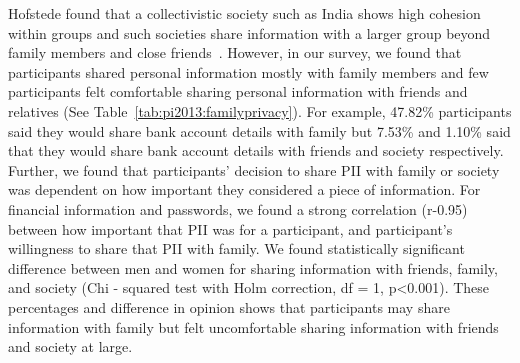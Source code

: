 Hofstede found that a collectivistic society such as India shows high cohesion within groups and such societies share information with a larger group beyond family members and close friends~\cite{hofstedecluturalbook:1991}. However, in our survey, we found that participants shared personal information mostly with family members and few participants felt comfortable sharing personal information with friends and relatives (See Table~\ref{tab:pi2013:familyprivacy}). For example, 47.82\%  participants said they would share bank account details with family but 7.53\% and 1.10\% said that they would share bank account details with friends and society respectively.
Further, we found that participants' decision to share PII with family or society was dependent on how important they considered a piece of information. For financial information and passwords, we found a strong correlation (r-0.95) between how important that PII was for a participant, and participant's willingness to share that PII with family. We found statistically significant difference between men and women for sharing information with friends, family, and society (Chi - squared test with Holm correction, df = 1, p<0.001). These percentages and difference in opinion shows that participants may share information with family but felt uncomfortable sharing information with friends and society at large.
 




